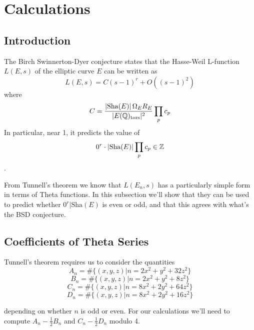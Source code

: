 \documentclass[12pt, a4paper]{amsart}
\begin{document}
\section{Calculations}

\subsection{Introduction}

The Birch Swinnerton-Dyer conjecture states that the Hasse-Weil L-function
$L(E,s)$ of the elliptic curve $E$ can be written as
\[L(E,s) = C (s-1)^r + O((s-1)^2)\] where
\[C = \frac{|\text{Sha}(E)| \, \Omega_E R_E}{|E({\mathbb Q})_{\text{tors}}|^2} \prod_p c_p\]
In particular, near 1, it predicts the value of
\[0^r \cdot |\text{Sha}(E)| \prod_p c_p \in {\mathbb Z}\].

From Tunnell's theorem we know that $L(E_n,s)$ has a particularly simple
form in terms of Theta functions. In this subsection we'll show that they
can be used to predict whether $0^r |\text{Sha}(E)$ is even or odd, and that
this agrees with what's the BSD conjecture.


\subsection{Coefficients of Theta Series}
Tunnell's theorem requires us to consider the quantities 
\[  A_n = \#\{(x,y,z) | n = 2x^2 + y^2 + 32z^2\} \]
\[  B_n = \#\{(x,y,z) | n = 2x^2 + y^2 + 8z^2\} \]
\[  C_n = \#\{(x,y,z) | n = 8x^2 + 2y^2 + 64z^2\} \]
\[  D_n = \#\{(x,y,z) | n = 8x^2 + 2y^2 + 16z^2\} \]

depending on whether $n$ is odd or even. For our calculations we'll
need to compute $A_n - \frac{1}{2}B_n$ and $C_n - \frac{1}{2}D_n$ modulo 4.
\end{document}

